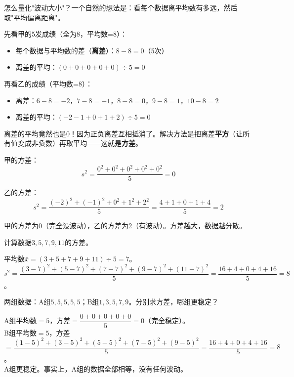 
怎么量化"波动大小"？一个自然的想法是：看每个数据离平均数有多远，然后取"平均偏离距离"。

先看甲的5发成绩（全为8，平均数=8）：
\begin{itemize}
\item 每个数据与平均数的差（\textbf{离差}）：$8-8=0$（5次）
\item 离差的平均：$(0+0+0+0+0)\div5=0$
\end{itemize}

再看乙的成绩（平均数=8）：
\begin{itemize}
\item 离差：$6-8=-2$，$7-8=-1$，$8-8=0$，$9-8=1$，$10-8=2$
\item 离差的平均：$(-2-1+0+1+2)\div5=0$
\end{itemize}

离差的平均竟然也是0！因为正负离差互相抵消了。解决方法是把离差\textbf{平方}（让所有值变成非负数）再取平均——这就是\textbf{方差}。

甲的方差：
\[
s^2 = \frac{0^2+0^2+0^2+0^2+0^2}{5}=0
\]

乙的方差：
\[
s^2 = \frac{(-2)^2+(-1)^2+0^2+1^2+2^2}{5} = \frac{4+1+0+1+4}{5}=2
\]

甲的方差为0（完全没波动），乙的方差为2（有波动）。方差越大，数据越分散。


\begin{example}
计算数据$3,5,7,9,11$的方差。
\end{example}
\begin{solution}
平均数$\bar x=(3+5+7+9+11)\div5=7$。\\
$s^2=\dfrac{(3-7)^2+(5-7)^2+(7-7)^2+(9-7)^2+(11-7)^2}{5}
=\dfrac{16+4+0+4+16}{5}=8$。
\end{solution}

\begin{example}
两组数据：A组$5,5,5,5,5$；B组$1,3,5,7,9$。分别求方差，哪组更稳定？
\end{example}
\begin{solution}
A组平均数$=5$，方差$=\dfrac{0+0+0+0+0}{5}=0$（完全稳定）。\\
B组平均数$=5$，方差$=\dfrac{(1-5)^2+(3-5)^2+(5-5)^2+(7-5)^2+(9-5)^2}{5}
=\dfrac{16+4+0+4+16}{5}=8$。\\
A组更稳定。事实上，A组的数据全部相等，没有任何波动。
\end{solution}

